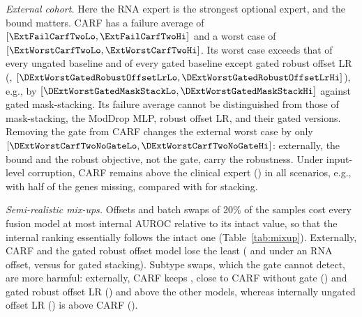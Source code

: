\documentclass[a4paper,runningheads]{llncs}
\begin{document}
\emph{External cohort.} Here the RNA expert is the strongest optional expert, and the bound matters. CARF has a failure average of \ExtFailCarfTwo{} $[\ExtFailCarfTwoLo,\ExtFailCarfTwoHi]$ and a worst case of \ExtWorstCarfTwo{} $[\ExtWorstCarfTwoLo,\ExtWorstCarfTwoHi]$. Its worst case exceeds that of every ungated baseline and of every gated baseline except gated robust offset LR (\ExtWorstGatedRobustOffsetLr{}, $[\DExtWorstGatedRobustOffsetLrLo,\DExtWorstGatedRobustOffsetLrHi]$), e.g., by $[\DExtWorstGatedMaskStackLo,\DExtWorstGatedMaskStackHi]$ against gated mask-stacking. Its failure average cannot be distinguished from those of mask-stacking, the ModDrop MLP, robust offset LR, and their gated versions. Removing the gate from CARF changes the external worst case by only $[\DExtWorstCarfTwoNoGateLo,\DExtWorstCarfTwoNoGateHi]$: externally, the bound and the robust objective, not the gate, carry the robustness. Under input-level corruption, CARF remains above the clinical expert (\ExtClinical{}) in all scenarios, e.g., \InpRnaDropoutFiveZeroCarfTwo{} with half of the genes missing, compared with \InpRnaDropoutFiveZeroStack{} for stacking.

\begin{table}[t]
\centering
\caption{AUROC under semi-realistic specimen mix-ups of 20\% of the samples (offset in accession order; swap within processing batch) and under swaps within HR/HER2 subtype (all samples). Internal: mean over 25 folds with 5 realizations; external: 30 realizations.}
\label{tab:mixup}
\setlength{\tabcolsep}{3pt}
\end{table}

\emph{Semi-realistic mix-ups.} Offsets and batch swaps of 20\% of the samples cost every fusion model at most \MixMaxLossInt{} internal AUROC relative to its intact value, so that the internal ranking essentially follows the intact one (Table~\ref{tab:mixup}). Externally, CARF and the gated robust offset model lose the least (\MixExtRnaOffsetCarfTwo{} and \MixExtRnaOffsetGatedRobustOffsetLr{} under an RNA offset, versus \MixExtRnaOffsetGatedStack{} for gated stacking). Subtype swaps, which the gate cannot detect, are more harmful: externally, CARF keeps \MixExtRnaSubtypeswapCarfTwo{}, close to CARF without gate (\MixExtRnaSubtypeswapCarfTwoNoGate{}) and gated robust offset LR (\MixExtRnaSubtypeswapGatedRobustOffsetLr{}) and above the other models, whereas internally ungated offset LR (\MixIntRnaSubtypeswapOffsetLr{}) is above CARF (\MixIntRnaSubtypeswapCarfTwo{}).
\end{document}
